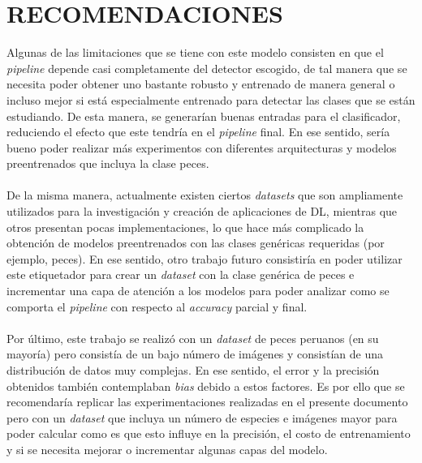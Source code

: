 \chapter*{\center \Large RECOMENDACIONES} 

Algunas de las limitaciones que se tiene con este modelo consisten en que el 
\textit{pipeline} depende casi completamente del detector escogido, de tal 
manera que se necesita poder obtener uno bastante robusto y entrenado de 
manera general o incluso mejor si está especialmente entrenado para detectar 
las clases que se están estudiando. De esta manera, se generarían buenas 
entradas para el clasificador, reduciendo el efecto que este tendría en el 
\textit{pipeline} final. En ese sentido, sería bueno poder realizar más 
experimentos con diferentes arquitecturas y modelos preentrenados que incluya 
la clase peces.
\\\\
De la misma manera, actualmente existen ciertos \textit{datasets} que son 
ampliamente utilizados para la investigación y creación de aplicaciones de 
DL, mientras que otros presentan pocas implementaciones, lo que hace más 
complicado la obtención de modelos preentrenados con las clases genéricas 
requeridas (por ejemplo, peces). En ese sentido, otro trabajo futuro 
consistiría en poder utilizar este etiquetador para crear un \textit{dataset} 
con la clase genérica de peces e incrementar una capa de atención a los modelos 
para poder analizar como se comporta el \textit{pipeline} con respecto al 
\textit{accuracy} parcial y final.   
\\\\
Por último, este trabajo se realizó con un \textit{dataset} de peces peruanos 
(en su mayoría) pero consistía de un bajo número de imágenes y consistían de 
una distribución de datos muy complejas. En ese sentido, el error y la 
precisión obtenidos también contemplaban \textit{bias} debido a estos factores. 
Es por ello que se recomendaría replicar las experimentaciones realizadas en 
el presente documento pero con un \textit{dataset} que incluya un número de 
especies e imágenes mayor para poder calcular como es que esto influye en la 
precisión, el costo de entrenamiento y si se necesita mejorar o incrementar 
algunas capas del modelo.

